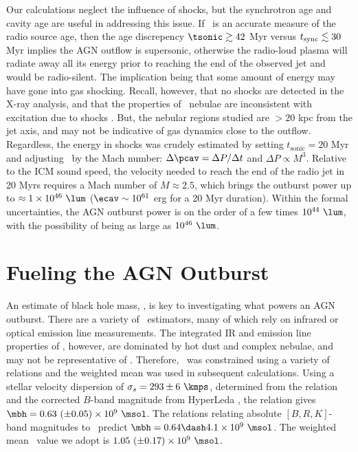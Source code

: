 \documentclass[useAMS,usenatbib]{mn2e}
\begin{document}
Our calculations neglect the influence of shocks, but the synchrotron
age and cavity age are useful in addressing this issue. If \tsync\ is
an accurate measure of the radio source age, then the age discrepency
$\tsonic \ga 42$ Myr versus $t_{\mathrm{sync}} \lesssim 30$ Myr implies the AGN
outflow is supersonic, otherwise the radio-loud plasma will radiate
away all its energy prior to reaching the end of the observed jet and
would be radio-silent. The implication being that some amount of
energy may have gone into gas shocking. Recall, however, that no
shocks are detected in the X-ray analysis, and that the properties of
\irs\ nebulae are inconsistent with excitation due to shocks
\citep{1996MNRAS.283.1003C, 2000AJ....120..562T}. But, the nebular
regions studied are $> 20$ kpc from the jet axis, and may not be
indicative of gas dynamics close to the outflow. Regardless, the
energy in shocks was crudely estimated by setting $t_{\mathrm{sonic}}
= 20$ Myr and adjusting \pcav\ by the Mach number: $\Delta \pcav =
\Delta P / \Delta t$ and $\Delta P \propto M^3$. Relative to the ICM
sound speed, the velocity needed to reach the end of the radio jet in
20 Myrs requires a Mach number of $M \approx 2.5$, which brings the
outburst power up to $\approx 1 \times 10^{46} ~\lum$ ($\ecav \sim
10^{61}$ erg for a 20 Myr duration). Within the formal uncertainties,
the AGN outburst power is on the order of a few times $10^{44} ~\lum$,
with the possibility of being as large as $10^{46} ~\lum$.

\section{Fueling the AGN Outburst}
\label{sec:fuel}

An estimate of black hole mass, \mbh, is key to investigating what
powers an AGN outburst. There are a variety of \mbh\ estimators, many
of which rely on infrared or optical emission line measurements. The
integrated IR and emission line properties of \irs, however, are
dominated by hot dust and complex nebulae, and may not be
representative of \mbh. Therefore, \mbh\ was constrained using a
variety of relations and the weighted mean was used in subsequent
calculations. Using a stellar velocity dispersion of $\sigma_s = 293
\pm 6 ~\kmps$, determined from the \citet{1976ApJ...204..668F}
relation and the corrected $B$-band magnitude from HyperLeda
\citep{hyperleda}, the \citet{2002ApJ...574..740T} relation gives
$\mbh = 0.63 ~(\pm 0.05) \times 10^9 ~\msol$. The
\citet{2007MNRAS.379..711G} relations relating absolute $[B,R,K]$-band
magnitudes to \mbh\ predict $\mbh = 0.64 \dash 4.1 \times 10^9
~\msol$. The weighted mean \mbh\ value we adopt is $1.05 ~(\pm 0.17)
\times 10^9 ~\msol$.
\end{document}
